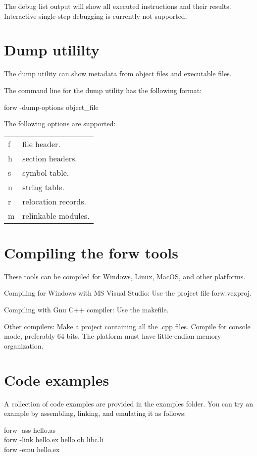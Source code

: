 \documentclass[forwardcom.tex]{subfiles}
\begin{document}
The debug list output will show all executed instructions and their results.
Interactive single-step debugging is currently not supported.
\vspace{2mm}

\section{Dump utililty} \label{dumpUtililty}

The dump utility can show metadata from object files and executable files.
\vspace{2mm}

The command line for the dump utility has the following format:
\vspace{2mm}

\hspace{5mm} {\ttfamily forw -dump-options object\_file }
\vspace{2mm}

The following options are supported:\\
\begin{tabular}{|p{10mm}p{150mm}|}
\hline
f & file header.\\
h & section headers.\\
s & symbol table.\\
n & string table.\\
r & relocation records.\\
m & relinkable modules.\\
\hline
\end{tabular}
\vspace{2mm}


\section{Compiling the forw tools} \label{compilingForw}

These tools can be compiled for Windows, Linux, MacOS, and other platforms.
\vspace{2mm}

Compiling for Windows with MS Visual Studio: Use the project file forw.vcxproj.

Compiling with Gnu C++ compiler: Use the makefile.

Other compilers: Make a project containing all the .cpp files. Compile for console mode, preferably 64 bits. The platform must have little-endian memory organization.

\section{Code examples} \label{codeExamples}
A collection of code examples are provided in the examples folder. You can try an example by assembling, linking, and emulating it as follows:
\vspace{2mm}

forw -ass hello.as \\
forw -link hello.ex hello.ob libc.li \\
forw -emu hello.ex
\vspace{2mm}
\end{document}

